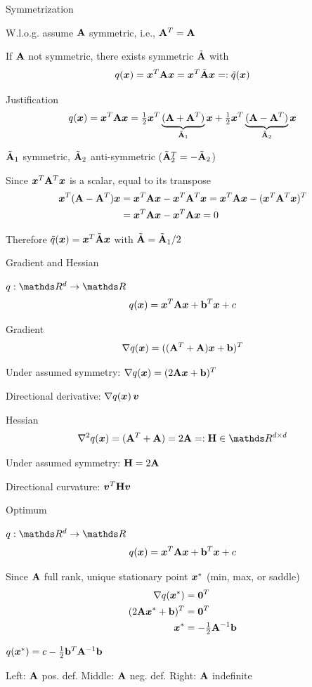 \documentclass[11pt,compress,t,notes=noshow, xcolor=table]{beamer}
\begin{document}
\begin{framei}{Symmetrization}
\item W.l.o.g. assume $\mathbf{A}$ symmetric, i.e., $\mathbf{A}^T = \mathbf{A}$
\item If $\mathbf{A}$ not symmetric, there exists symmetric $\tilde {\mathbf{A}}$ with $$ q(\bm{x}) = \bm{x}^T \mathbf{A} \bm{x} = \bm{x}^T \tilde {\mathbf{A}} \bm{x} =: \tilde q(\bm{x}) $$
\item Justification
$$ q(\bm{x}) = \bm{x}^T \mathbf{A} \bm{x} = \tfrac12 \bm{x}^T \underbrace{(\mathbf{A} + \mathbf{A}^T)}_{\tilde {\mathbf{A}}_1} \bm{x} + \tfrac12 \bm{x}^T \underbrace{(\mathbf{A} - \mathbf{A}^T)}_{\tilde {\mathbf{A}}_2} \bm{x} $$
\item $\tilde {\mathbf{A}}_1$ symmetric, $\tilde {\mathbf{A}}_2$ anti-symmetric ($\tilde {\mathbf{A}}_2^T = - \tilde {\mathbf{A}}_2$)
\item Since $\bm{x}^T \mathbf{A}^T \bm{x}$ is a scalar, equal to its transpose
\begin{align*}
\bm{x}^T (\mathbf{A} - \mathbf{A}^T) \bm{x} &= \bm{x}^T \mathbf{A} \bm{x} - \bm{x}^T \mathbf{A}^T \bm{x} = \bm{x}^T \mathbf{A} \bm{x} - (\bm{x}^T \mathbf{A}^T \bm{x})^T \\
                      &= \bm{x}^T \mathbf{A} \bm{x} - \bm{x}^T \mathbf{A} \bm{x} = 0
\end{align*}
\item Therefore $\tilde q(\bm{x}) = \bm{x}^T \tilde {\mathbf{A}} \bm{x}$ with $\tilde {\mathbf{A}} = \tilde {\mathbf{A}}_1/2$
\end{framei}


\begin{framei}{Gradient and Hessian}
\item $q: \R^d \to \R$
$$ q(\bm{x}) = \bm{x}^T \mathbf{A} \bm{x} + \mathbf{b}^T \bm{x} + c $$
\item Gradient
$$ \nabla q(\bm{x}) = ((\mathbf{A}^T + \mathbf{A}) \bm{x} + \mathbf{b})^T $$
\item Under assumed symmetry: $\nabla q(\bm{x}) = (2 \mathbf{A} \bm{x} + \mathbf{b})^T$
\item Directional derivative: $\nabla q(\bm{x})\, \bm{v} $
\item Hessian
$$ \nabla^2 q(\xv) = (\A^T + \A) = 2 \A =: \H \in \R^{d \times d} $$
\item Under assumed symmetry: $\mathbf{H} = 2 \mathbf{A}$
\item Directional curvature: $\bm{v}^T \mathbf{H} \bm{v} $
\end{framei}


\begin{framei}{Optimum}
\item $q: \R^d \to \R$
$$ q(\bm{x}) = \bm{x}^T \mathbf{A} \bm{x} + \mathbf{b}^T \bm{x} + c $$
\item Since $\mathbf{A}$ full rank, unique stationary point $\bm{x}^\ast$ (min, max, or saddle)
\begin{align*}
\nabla q(\bm{x}^\ast)      &= \boldsymbol{0}^T \\
(2 \mathbf{A} \bm{x}^\ast + \mathbf{b})^T &= \boldsymbol{0}^T \\
\bm{x}^\ast                &= -\tfrac{1}{2} \mathbf{A}^{-1} \mathbf{b}
\end{align*}
\item $q(\bm{x}^\ast) = c - \frac12 \mathbf{b}^T \mathbf{A}^{-1} \mathbf{b}$
\vfill
{}
\item Left: $\mathbf{A}$ pos. def. \quad Middle: $\mathbf{A}$ neg. def. \quad Right: $\mathbf{A}$ indefinite
\end{framei}
\end{document}
